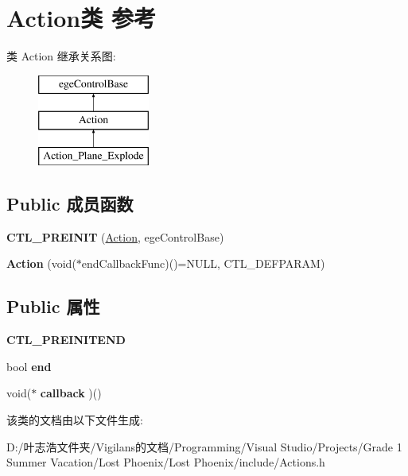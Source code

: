 \hypertarget{class_action}{}\section{Action类 参考}
\label{class_action}
类 Action 继承关系图\+:\begin{figure}[H]
\begin{center}
\leavevmode
\includegraphics[height=3.000000cm]{class_action}
\end{center}
\end{figure}
\subsection*{Public 成员函数}
\begin{DoxyCompactItemize}
\item 
\mbox{\label{class_action_a4d1309da871dfc1da7b4bdc896e34c0e}} 
{\bfseries C\+T\+L\+\_\+\+P\+R\+E\+I\+N\+IT} (\hyperlink{class_action}{Action}, ege\+Control\+Base)
\item 
\mbox{\label{class_action_a656f4ac0205bbd055dd360248786475a}} 
{\bfseries Action} (void($\ast$end\+Callback\+Func)()=N\+U\+LL, C\+T\+L\+\_\+\+D\+E\+F\+P\+A\+R\+AM)
\end{DoxyCompactItemize}
\subsection*{Public 属性}
\begin{DoxyCompactItemize}
\item 
\mbox{\label{class_action_a682e7ba0a9ef3f891382df776c1ce883}} 
{\bfseries C\+T\+L\+\_\+\+P\+R\+E\+I\+N\+I\+T\+E\+ND}
\item 
\mbox{\label{class_action_a28332e6535d45661d768bb1b321f4715}} 
bool {\bfseries end}
\item 
\mbox{\label{class_action_aef6c7c00b09ea1b0ddd7a26926309717}} 
void($\ast$ {\bfseries callback} )()
\end{DoxyCompactItemize}


该类的文档由以下文件生成\+:\begin{DoxyCompactItemize}
\item 
D\+:/叶志浩文件夹/\+Vigilans的文档/\+Programming/\+Visual Studio/\+Projects/\+Grade 1 Summer Vacation/\+Lost Phoenix/\+Lost Phoenix/include/Actions.\+h\end{DoxyCompactItemize}
